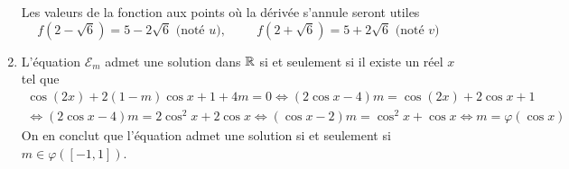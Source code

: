 \begin{enumerate}
Les valeurs de la fonction aux points où la dérivée s'annule seront utiles
\begin{displaymath}
  f(2-\sqrt{6}) = 5-2\sqrt{6}\text{ (noté $u$)},\hspace{1cm}
  f(2+\sqrt{6}) = 5+2\sqrt{6} \text{ (noté $v$)}
\end{displaymath}
  \item L'équation $\mathcal{E}_m$ admet une solution dans $\mathbb{R}$ si et seulement si il existe un réel $x$ tel que
\begin{multline*}
\cos(2x) + 2(1-m)\cos x +1 +4m = 0 \Leftrightarrow
(2\cos x -4)m = \cos(2x) + 2\cos x + 1 \\
\Leftrightarrow
(2\cos x -4)m = 2\cos^2 x + 2\cos x 
\Leftrightarrow
(\cos x -2)m = \cos^2 x + \cos x \Leftrightarrow m = \varphi(\cos x)
\end{multline*}
On en conclut que l'équation admet une solution si et seulement si $m\in \varphi([-1,1])$.


\end{enumerate}
